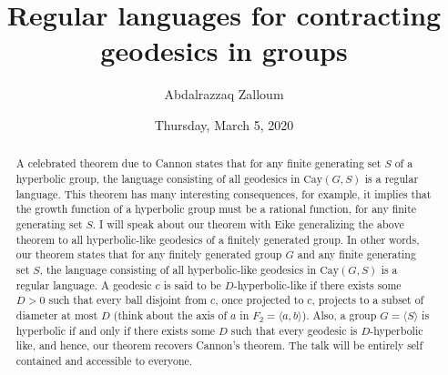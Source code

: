 \documentclass{UAmathtalk}
\author{Abdalrazzaq Zalloum}
\title{Regular languages for contracting geodesics in groups}
\date{Thursday, March 5, 2020}
\begin{document}
\maketitle

\begin{abstract}
A celebrated theorem due to Cannon states that for any finite generating set $S$ of a hyperbolic group, the language consisting of all geodesics in $\textrm{Cay}(G,S)$ is a regular language. This theorem has many interesting consequences, for example, it implies that the growth function of a hyperbolic group must be a rational function, for any finite generating set $S$. I will speak about our theorem with Eike generalizing the above theorem to all hyperbolic-like geodesics of a finitely generated group. In other words, our theorem states that for any finitely generated group $G$ and any finite generating set $S$, the language consisting of all hyperbolic-like geodesics in $\textrm{Cay}(G,S)$ is a regular language. A geodesic $c$ is said to be $D$-hyperbolic-like if there exists some $D>0$ such that every ball disjoint from $c$, once projected to $c$, projects to a subset of diameter at most $D$ (think about the axis of $a$ in $F_2=\langle a,b\rangle$). Also, a group $G=\langle S\rangle$ is hyperbolic if and only if there exists some $D$ such that every geodesic is $D$-hyperbolic like, and hence, our theorem recovers Cannon's theorem. The talk will be entirely self contained and accessible to everyone.
\end{abstract}
\end{document}
